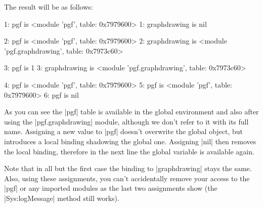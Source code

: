 \begin{codeexample}
  

  \usetikzlibrary{graphdrawing}

\end{codeexample}

The result will be as follows:

\begin{codeexample}
1: pgf is <module 'pgf', table: 0x7979600>
1: graphdrawing is nil

2: pgf is <module 'pgf', table: 0x7979600>
2: graphdrawing is <module 'pgf.graphdrawing', table: 0x7973c60>

3: pgf is 1
3: graphdrawing is <module 'pgf.graphdrawing', table: 0x7973c60>

4: pgf is <module 'pgf', table: 0x7979600>
5: pgf is <module 'pgf', table: 0x7979600>
6: pgf is nil
\end{codeexample}

As you can see the |pgf| table is available in the global environment
and also after using the |pgf.graphdrawing| module, although we don't
refer to it with its full name.  Assigning a new value to |pgf|
doesn't overwrite the global object, but introduces a local binding
shadowing the global one. Assigning |nil| then removes the local
binding, therefore in the next line the global variable is available
again.

Note that in all but the first case the binding to |graphdrawing|
stays the same.  Also, using these assignments, you can't accidentally
remove your access to the |pgf| or any imported modules as the last
two assignments show (the |Sys:logMessage| method still works).


